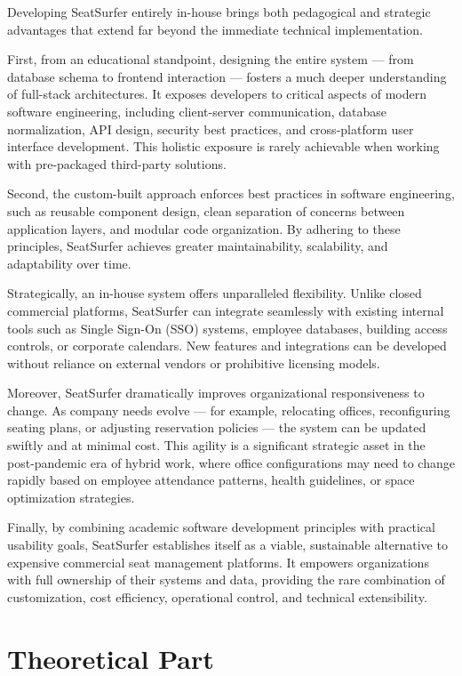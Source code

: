 \documentclass[12pt,a4paper]{report} %
\begin{document}
Developing SeatSurfer entirely in-house brings both pedagogical and strategic advantages that extend far beyond the immediate technical implementation.

First, from an educational standpoint, designing the entire system — from database schema to frontend interaction — fosters a much deeper understanding of full-stack architectures. It exposes developers to critical aspects of modern software engineering, including client-server communication, database normalization, API design, security best practices, and cross-platform user interface development. This holistic exposure is rarely achievable when working with pre-packaged third-party solutions.

Second, the custom-built approach enforces best practices in software engineering, such as reusable component design, clean separation of concerns between application layers, and modular code organization. By adhering to these principles, SeatSurfer achieves greater maintainability, scalability, and adaptability over time.

Strategically, an in-house system offers unparalleled flexibility. Unlike closed commercial platforms, SeatSurfer can integrate seamlessly with existing internal tools such as Single Sign-On (SSO) systems, employee databases, building access controls, or corporate calendars. New features and integrations can be developed without reliance on external vendors or prohibitive licensing models.

Moreover, SeatSurfer dramatically improves organizational responsiveness to change. As company needs evolve — for example, relocating offices, reconfiguring seating plans, or adjusting reservation policies — the system can be updated swiftly and at minimal cost. This agility is a significant strategic asset in the post-pandemic era of hybrid work, where office configurations may need to change rapidly based on employee attendance patterns, health guidelines, or space optimization strategies.

Finally, by combining academic software development principles with practical usability goals, SeatSurfer establishes itself as a viable, sustainable alternative to expensive commercial seat management platforms. It empowers organizations with full ownership of their systems and data, providing the rare combination of customization, cost efficiency, operational control, and technical extensibility.

\newpage

\chapter{Theoretical Part}
\end{document}
